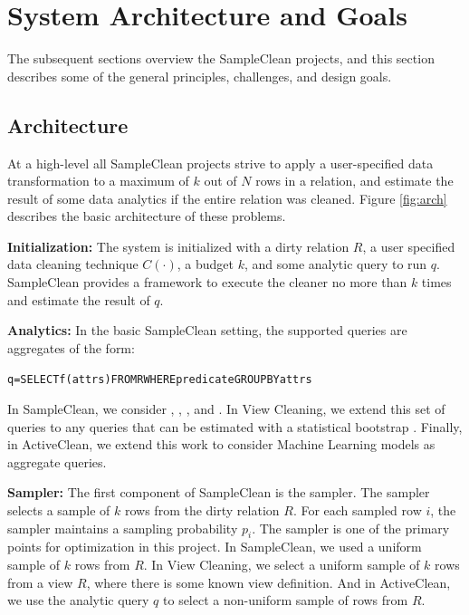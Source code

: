 \section{System Architecture and Goals}
The subsequent sections overview the SampleClean projects, and this section describes some of the general principles, challenges, and design goals. 

\subsection{Architecture}
At a high-level all SampleClean projects strive to apply a user-specified data transformation to a maximum of $k$ out of $N$ rows in a relation, and estimate the result of some data analytics if the entire relation was cleaned. Figure \ref{fig:arch} describes the basic architecture of these problems. 

\vspace{0.5em}
\noindent\textbf{Initialization: } The system is initialized with a dirty relation $R$, a user specified data cleaning technique $C(\cdot)$, a budget $k$, and some analytic query to run $q$. SampleClean provides a framework to execute the cleaner no more than $k$ times and estimate the result of $q$.  

\vspace{0.5em}
\noindent\textbf{Analytics: } In the basic SampleClean setting, the supported queries are aggregates of the form:
\begin{alltt}
q = SELECT \textsf{f}(attrs) FROM R WHERE predicate GROUP BY attrs
\end{alltt}
In SampleClean, we consider \avgfunc, \sumfunc, \countfunc, and \varfunc.
In View Cleaning, we extend this set of queries to any queries that can be estimated with a statistical bootstrap \cite{agarwalknowing}. 
Finally, in ActiveClean, we extend this work to consider Machine Learning models as aggregate queries.

\vspace{0.5em}
\noindent\textbf{Sampler: } The first component of SampleClean is the sampler. The sampler selects a sample of $k$ rows from the dirty relation $R$. For each sampled row $i$, the sampler maintains a sampling probability $p_i$. The sampler is one of the primary points for optimization in this project. In SampleClean, we used a uniform sample of $k$ rows from $R$.
In View Cleaning, we select a uniform sample of $k$ rows from a view $R$, where there is some known view definition.
And in ActiveClean, we use the analytic query $q$ to select a non-uniform sample of rows from $R$.

